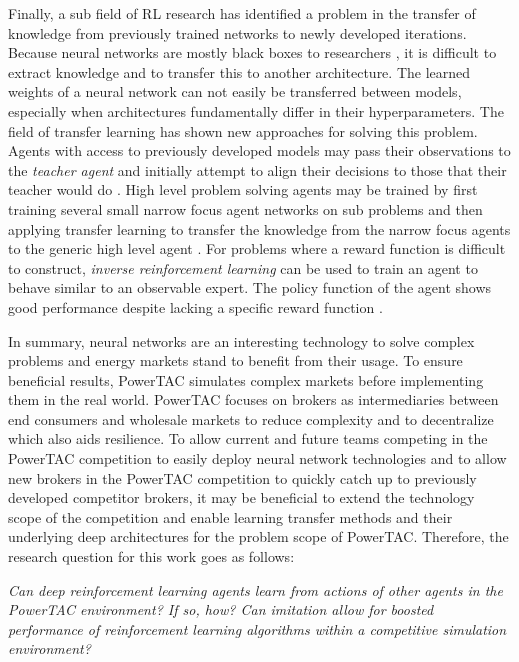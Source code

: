 Finally, a sub field of \ac{RL} research has identified a problem in the transfer of knowledge from previously trained
networks to newly developed iterations. Because neural networks are mostly black boxes to researchers
\cite[]{yosinski2015understanding}, it is difficult to extract knowledge and to transfer this to another architecture. The
learned weights of a neural network can not easily be transferred between models, especially when architectures fundamentally
differ in their hyperparameters. The field of transfer learning has shown new approaches for solving this problem.
Agents with access to previously developed models may pass their observations to the \emph{teacher agent} and initially
attempt to align their decisions to those that their teacher would do \cite[]{schmitt2018kickstarting}. High level 
problem solving agents may be trained by first training several small narrow focus agent networks on sub problems and
then applying transfer learning to transfer the knowledge from the narrow focus agents to the generic high level
agent \cite[]{parisotto2015actor}. For problems where a reward function is difficult to construct, \emph{inverse
reinforcement learning} can be used to train an agent to behave similar to an observable expert. The policy function of
the agent shows good performance despite lacking a specific reward function \cite[]{NG2004Apprentice}.

In summary, neural networks are an interesting technology to solve complex problems and energy markets stand to benefit from
their usage. To ensure beneficial results, \ac{PowerTAC} simulates complex markets before implementing them in the real
world. \ac{PowerTAC} focuses on brokers as intermediaries between end consumers and wholesale markets to reduce
complexity and to decentralize which also aids resilience. To allow current and future teams competing in the \ac{PowerTAC}
competition to easily deploy neural network technologies and to allow new brokers in the \ac{PowerTAC} competition to quickly
catch up to previously developed competitor brokers, it may be beneficial to extend the technology scope of the
competition and enable learning transfer methods and their underlying deep architectures for the problem scope of
\ac{PowerTAC}. Therefore, the research question for this work goes as follows:

\emph{Can deep reinforcement learning agents learn from actions of other agents in the \ac{PowerTAC} environment? If so,
    how? Can imitation allow for boosted performance of reinforcement learning algorithms within a competitive simulation
environment?}



